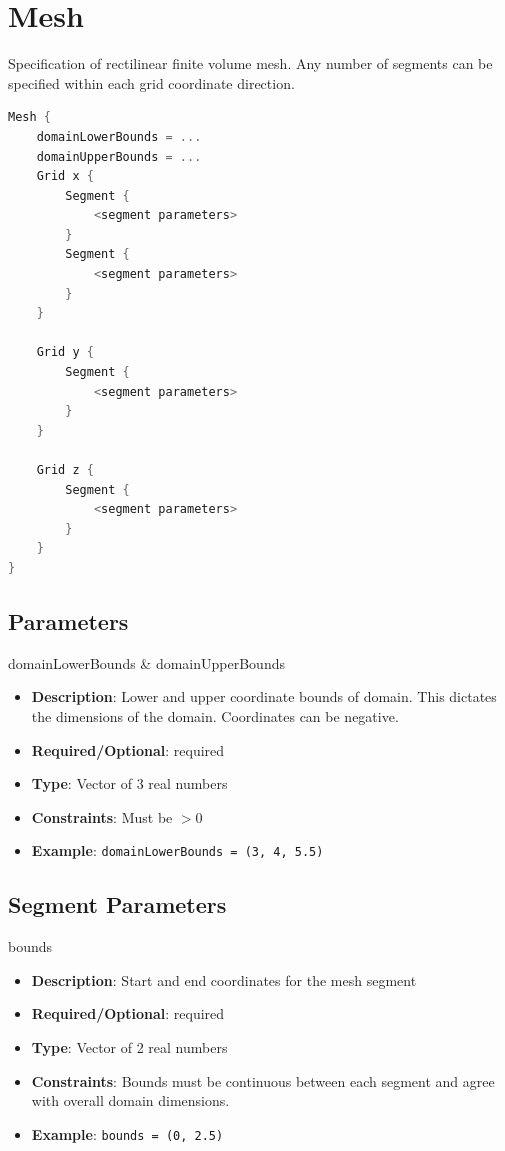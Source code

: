 \section{Mesh}
Specification of rectilinear finite volume mesh. Any number of segments can be specified within each grid coordinate direction.

\begin{lstlisting}[language=C++]
Mesh {
    domainLowerBounds = ...
    domainUpperBounds = ...
    Grid x {
        Segment {
            <segment parameters>
        }
        Segment {
            <segment parameters>
        }
    }

    Grid y {
        Segment {
            <segment parameters>
        }
    }

    Grid z {
        Segment {
            <segment parameters>
        }
    }
}
\end{lstlisting}

\subsection*{Parameters}

domainLowerBounds \& domainUpperBounds
\vspace{\the\parameterListSpacing}
\begin{itemize}
    \item {\bf Description}: Lower and upper coordinate bounds of domain. This dictates the dimensions of the domain. Coordinates can be negative.
    \item {\bf Required/Optional}: required
    \item {\bf Type}: Vector of 3 real numbers
    \item {\bf Constraints}: Must be $>0$
    \item {\bf Example}: \lstinline!domainLowerBounds = (3, 4, 5.5)!
\end{itemize}


\subsection*{Segment Parameters}

bounds
\vspace{\the\parameterListSpacing}
\begin{itemize}
    \item {\bf Description}: Start and end coordinates for the mesh segment
    \item {\bf Required/Optional}: required
    \item {\bf Type}: Vector of 2 real numbers
    \item {\bf Constraints}: Bounds must be continuous between each segment and agree with overall domain dimensions.
    \item {\bf Example}: \lstinline!bounds = (0, 2.5)!
\end{itemize}

